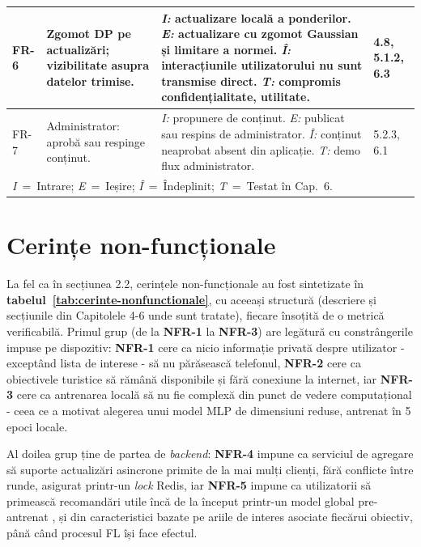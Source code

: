\documentclass[12pt,a4paper]{report}
\begin{document}
\begin{table}[h]
\begin{tabular}{|l|p{2.8cm}|p{8cm}|p{1.8cm}|}
\hline
FR-6 & Zgomot DP pe actualizări; vizibilitate asupra datelor trimise. &
\textit{I:} actualizare locală a ponderilor. \textit{E:} actualizare cu zgomot Gaussian și limitare a normei. \textit{Î:} interacțiunile utilizatorului nu sunt transmise direct. \textit{T:} compromis confidențialitate, utilitate. & 4.8, 5.1.2, 6.3 \\
\hline
FR-7 & Administrator: aprobă sau respinge conținut. &
\textit{I:} propunere de conținut. \textit{E:} publicat sau respins de administrator. \textit{Î:} conținut neaprobat absent din aplicație. \textit{T:} demo flux administrator. & 5.2.3, 6.1 \\
\hline
\multicolumn{4}{l}{\textit{I}~=~Intrare; \textit{E}~=~Ieșire; \textit{Î}~=~Îndeplinit; \textit{T}~=~Testat în Cap.~6.} \\
\end{tabular}
\end{table}

\section{Cerințe non-funcționale}

La fel ca în secțiunea 2.2, cerințele non-funcționale au fost sintetizate în \textbf{tabelul~\ref{tab:cerinte-nonfunctionale}}, cu aceeași structură (descriere și secțiunile din Capitolele 4-6 unde sunt tratate), fiecare însoțită de o metrică verificabilă. Primul grup (de la \textbf{NFR-1} la \textbf{NFR-3}) are legătură cu constrângerile impuse pe dispozitiv: \textbf{NFR-1} cere ca nicio informație privată despre utilizator - exceptând lista de interese - să nu părăsească telefonul, \textbf{NFR-2} cere ca obiectivele turistice să rămână disponibile și fără conexiune la internet, iar \textbf{NFR-3} cere ca antrenarea locală să nu fie complexă din punct de vedere computațional - ceea ce a motivat alegerea unui model MLP de dimensiuni reduse, antrenat în 5 epoci locale.

Al doilea grup ține de partea de \textit{backend}: \textbf{NFR-4} impune ca serviciul de agregare să suporte actualizări asincrone primite de la mai mulți clienți, fără conflicte între runde, asigurat printr-un \textit{lock} Redis, iar \textbf{NFR-5} impune ca utilizatorii să primească recomandări utile încă de la început printr-un model global pre-antrenat \cite{bonawitz2019towards}, și din caracteristici bazate pe ariile de interes asociate fiecărui obiectiv, până când procesul FL își face efectul.
\end{document}
